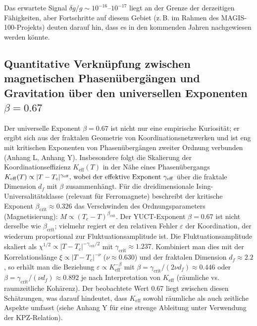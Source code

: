 \documentclass[12pt]{article}
\theoremstyle{remark}
\newcommand{\Keff}{K_{\mathrm{eff}}}
\begin{document}
	Das erwartete Signal $\delta g/g \sim 10^{-16}$–$10^{-17}$ liegt an der Grenze der derzeitigen Fähigkeiten, aber Fortschritte auf diesem Gebiet (z. B. im Rahmen des MAGIS-100-Projekts) deuten darauf hin, dass es in den kommenden Jahren nachgewiesen werden könnte.
	
	\subsection{Quantitative Verknüpfung zwischen magnetischen Phasenübergängen und Gravitation über den universellen Exponenten \(\beta = 0.67\)}
	\label{subsec:magnetic-gravity-link}
	
	Der universelle Exponent \(\beta = 0.67\) ist nicht nur eine empirische Kuriosität; er ergibt sich aus der fraktalen Geometrie von Koordinationsnetzwerken und ist eng mit kritischen Exponenten von Phasenübergängen zweiter Ordnung verbunden (Anhang L, Anhang Y). Insbesondere folgt die Skalierung der Koordinationseffizienz \(\Keff(T)\) in der Nähe eines Phasenübergangs \(\Keff(T) \propto |T - T_c|^{\gamma_{\mathrm{eff}}}$, wobei der effektive Exponent \(\gamma_{\mathrm{eff}}\) über die fraktale Dimension \(d_f\) mit \(\beta\) zusammenhängt. Für die dreidimensionale Ising-Universalitätsklasse (relevant für Ferromagnete) beschreibt der kritische Exponent \(\beta_{\mathrm{crit}} \approx 0.326\) das Verschwinden des Ordnungsparameters (Magnetisierung): \(M \propto (T_c - T)^{\beta_{\mathrm{crit}}}\). Der YUCT-Exponent \(\beta = 0.67\) ist nicht derselbe wie \(\beta_{\mathrm{crit}}\); vielmehr regiert er den relativen Fehler \(\varepsilon\) der Koordination, der wiederum proportional zur Fluktuationsamplitude ist. Die Fluktuationsamplitude skaliert als \(\chi^{1/2} \propto |T - T_c|^{-\gamma_{\mathrm{crit}}/2}\) mit \(\gamma_{\mathrm{crit}} \approx 1.237\). Kombiniert man dies mit der Korrelationslänge \(\xi \propto |T - T_c|^{-\nu}\) (\(\nu \approx 0.630\)) und der fraktalen Dimension \(d_f \approx 2.2\), so erhält man die Beziehung \(\varepsilon \propto \Keff^{-\beta}\) mit \(\beta = \gamma_{\mathrm{crit}}/(2\nu d_f) \approx 0.446\) oder \(\beta = \gamma_{\mathrm{crit}}/(\nu d_f) \approx 0.892\) je nach Interpretation von \(\Keff\) (räumliche vs. raumzeitliche Kohärenz). Der beobachtete Wert 0.67 liegt zwischen diesen Schätzungen, was darauf hindeutet, dass \(\Keff\) sowohl räumliche als auch zeitliche Aspekte umfasst (siehe Anhang Y für eine strenge Ableitung unter Verwendung der KPZ-Relation).
	
\end{document}
